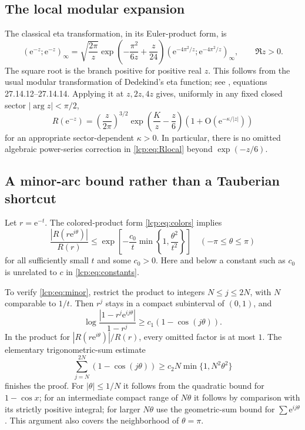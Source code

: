 \documentclass[11pt]{article}
\numberwithin{equation}{section}
\theoremstyle{definition}\newtheorem{definition}[theorem]{Definition}
\theoremstyle{remark}\newtheorem{remark}[theorem]{Remark}
\newcommand{\OO}{\mathrm O}
\newcommand{\ee}{\mathrm e}
\begin{document}
\subsection{The local modular expansion}
The classical eta transformation, in its Euler-product form, is
\begin{equation}\label{lcp:eq:eta}
 (\ee^{-z};\ee^{-z})_\infty
 =\sqrt{\frac{2\pi}{z}}
  \exp\!\left(-\frac{\pi^2}{6z}+\frac z{24}\right)
  (\ee^{-4\pi^2/z};\ee^{-4\pi^2/z})_\infty,
 \qquad \Re z>0.
\end{equation}
The square root is the branch positive for positive real $z$.
This follows from the usual modular transformation of Dedekind's eta
function; see \cite{dlmf}, equations 27.14.12--27.14.14.
Applying it at $z,2z,4z$ gives, uniformly in any fixed closed sector
$|\arg z|<\pi/2$,
\begin{equation}\label{lcp:eq:Rlocal}
 R(\ee^{-z})=\left(\frac z{2\pi}\right)^{3/2}
 \exp\!\left(\frac Kz-\frac z6\right)
 \left(1+\OO(\ee^{-\kappa/|z|})\right)
\end{equation}
for an appropriate sector-dependent $\kappa>0$.
In particular, there is no omitted algebraic power-series correction
in \eqref{lcp:eq:Rlocal} beyond $\exp(-z/6)$.

\subsection{A minor-arc bound rather than a Tauberian shortcut}
Let $r=\ee^{-t}$. The colored-product form \eqref{lcp:eq:colors} implies
\begin{equation}\label{lcp:eq:minor}
 \frac{|R(r\ee^{i\theta})|}{R(r)}
 \le\exp\!\left[-\frac{c_0}{t}
             \min\!\left\{1,\frac{\theta^2}{t^2}\right\}\right]
 \quad(-\pi\le\theta\le\pi)
\end{equation}
for all sufficiently small $t$ and some $c_0>0$.
Here and below a constant such as $c_0$ is unrelated to $c$ in
\eqref{lcp:eq:constants}.

To verify \eqref{lcp:eq:minor}, restrict the product to integers
$N\le j\le2N$, with $N$ comparable to $1/t$. Then $r^j$ stays in a
compact subinterval of $(0,1)$, and
\[
 \log\frac{|1-r^j\ee^{ij\theta}|}{1-r^j}
 \ge c_1(1-\cos(j\theta)).
\]
In the product for $|R(r\ee^{i\theta})|/R(r)$, every omitted
factor is at most $1$. The elementary
trigonometric-sum estimate
\[
 \sum_{j=N}^{2N}(1-\cos(j\theta))
 \ge c_2N\min\{1,N^2\theta^2\}
\]
finishes the proof. For $|\theta|\le1/N$ it follows from the quadratic
bound for $1-\cos x$; for an intermediate compact range of $N\theta$
it follows by comparison with its strictly positive integral; for larger
$N\theta$ use the geometric-sum bound for $\sum\ee^{ij\theta}$.
This argument also covers the neighborhood of $\theta=\pi$.
\end{document}
